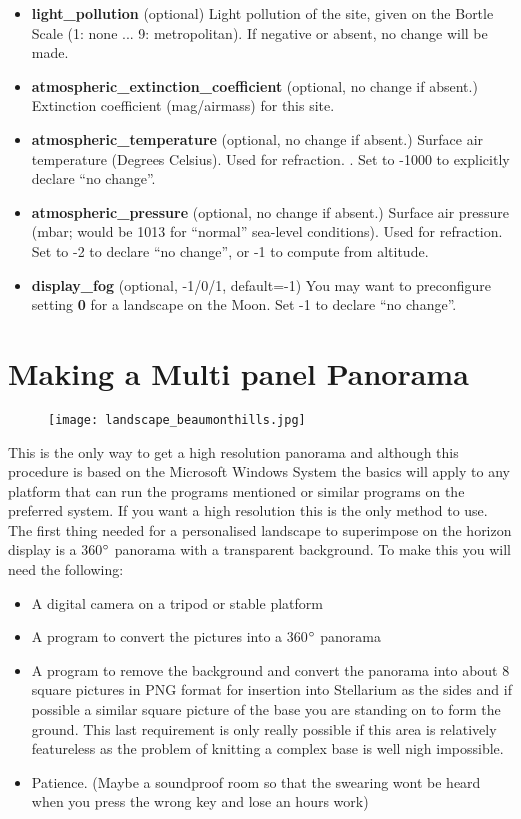 \begin{itemize}
\item
  \textbf{light\_pollution} (optional) Light pollution of the site,
  given on the Bortle Scale (1: none ... 9: metropolitan). If negative
  or absent, no change will be made.
\item
  \textbf{atmospheric\_extinction\_coefficient} (optional, no change if
  absent.) Extinction coefficient (mag/airmass) for this site.
\item
  \textbf{atmospheric\_temperature} (optional, no change if absent.)
  Surface air temperature (Degrees Celsius). Used for refraction. . Set
  to -1000 to explicitly declare ``no change''.
\item
  \textbf{atmospheric\_pressure} (optional, no change if absent.)
  Surface air pressure (mbar; would be 1013 for ``normal'' sea-level
  conditions). Used for refraction. Set to -2 to declare ``no change'',
  or -1 to compute from altitude.
\item
  \textbf{display\_fog} (optional, -1/0/1, default=-1) You may want to
  preconfigure setting \textbf{0} for a landscape on the Moon. Set -1 to
  declare ``no change''.
\end{itemize}

\section{Making a Multi panel
Panorama}\label{making-a-multi-panel-panorama}

\begin{figure}[h]
\centering\texttt{[image: landscape\_beaumonthills.jpg]}
\end{figure}

This is the only way to get a high resolution panorama and although this
procedure is based on the Microsoft Windows System the basics will apply
to any platform that can run the programs mentioned or similar programs
on the preferred system. If you want a high resolution this is the only
method to use. The first thing needed for a personalised landscape to
superimpose on the horizon display is a 360$\degree$ panorama with a transparent
background. To make this you will need the following:

\begin{itemize}
\item
  A digital camera on a tripod or stable platform
\item
  A program to convert the pictures into a 360$\degree$ panorama
\item
  A program to remove the background and convert the panorama into about
  8 square pictures in PNG format for insertion into Stellarium as the
  sides and if possible a similar square picture of the base you are
  standing on to form the ground. This last requirement is only really
  possible if this area is relatively featureless as the problem of
  knitting a complex base is well nigh impossible.
\item
  Patience. (Maybe a soundproof room so that the swearing wont be heard
  when you press the wrong key and lose an hours work)
\end{itemize}

